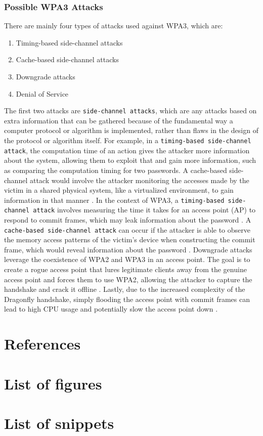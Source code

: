 \documentclass[a4paper]{article}
\begin{document}
\subsubsection{Possible WPA3 Attacks}
There are mainly four types of attacks used against WPA3, which are:
\begin{enumerate}
    \item Timing-based side-channel attacks
    \item Cache-based side-channel attacks
    \item Downgrade attacks
    \item Denial of Service
\end{enumerate}
The first two attacks are \texttt{side-channel attacks}, which are any attacks based on extra information that can be gathered because of the fundamental way a computer protocol or algorithm is implemented, rather than flaws in the design of the protocol or algorithm itself. For example, in a \texttt{timing-based side-channel attack}, the computation time of an action gives the attacker more information about the system, allowing them to exploit that and gain more information, such as comparing the computation timing for two passwords. A cache-based side-channel attack would involve the attacker monitoring the accesses made by the victim in a shared physical system, like a virtualized environment, to gain information in that manner \cite{noauthor_side-channel_2025}.\nl \nl
In the context of WPA3, a \texttt{timing-based side-channel attack} involves measuring the time it takes for an access point (AP) to respond to commit frames, which may leak information about the password \cite{noauthor_dragonblood_2024}. \nl \nl
A \texttt{cache-based side-channel attack} can occur if the attacker is able to observe the memory access patterns of the victim's device when constructing the commit frame, which would reveal information about the password \cite{noauthor_dragonblood_2024}. \nl \nl
Downgrade attacks leverage the coexistence of WPA2 and WPA3 in an access point. The goal is to create a rogue access point that lures legitimate clients away from the genuine access point and forces them to use WPA2, allowing the attacker to capture the handshake and crack it offline \cite{noauthor_dragonblood_2024}. \nl \nl
Lastly, due to the increased complexity of the Dragonfly handshake, simply flooding the access point with commit frames can lead to high CPU usage and potentially slow the access point down \cite{noauthor_dragonblood_2024}. \nl \nl


\newpage
\section{References}

\newpage
\section{List of figures}
\listoffigures
\newpage
\section{List of snippets}
\listoflistings
\end{document}
